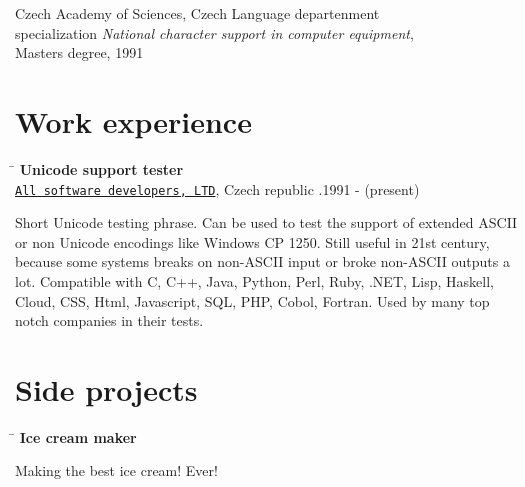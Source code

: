 \documentclass[letterpaper]{article}
\renewenvironment{itemize}{
  \begin{list}{}{
    \setlength{\leftmargin}{1.5em}
  }
}{
  \end{list}
}
\begin{document}
\begin{itemize}
  \item Czech Academy of Sciences, Czech Language departenment \\
  specialization \emph{National character support in computer equipment}, \\
  Masters degree, 1991
\end{itemize}

\section*{Work experience}
\begin{itemize}

  \item{\begin{tabbing}
   \hspace{4.5in}\= \kill %
    {\bf Unicode support tester} \> \\
     \href{https://dbvisit.com}{\tt All software developers, LTD}, Czech republic .1991 - (present)\\
   \end{tabbing}\vspace{-12pt}

            Short Unicode testing phrase. Can be used to test the support of extended ASCII or non Unicode encodings like Windows CP 1250. Still useful in 21st century, because some systems breaks on non-ASCII input or broke non-ASCII outputs a lot. Compatible with C, C++, Java, Python, Perl, Ruby, .NET, Lisp, Haskell, Cloud, CSS, Html, Javascript, SQL, PHP, Cobol, Fortran. Used by many top notch companies in their tests.

}
\end{itemize}

\section*{Side projects}
\begin{itemize}
  \item{\begin{tabbing}
   \hspace{4.5in}\= \kill %
    {\bf Ice cream maker} \> \\
   \end{tabbing}\vspace{-12pt}

            Making the best ice cream! Ever!

}
\end{itemize}
\end{document}
